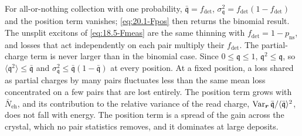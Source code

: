 For all-or-nothing collection with one probability, $\bar{\mathfrak{q}} = f_{\mathrm{det}}$, $\sigma_{\mathfrak{q}}^2 = f_{\mathrm{det}}(1 - f_{\mathrm{det}})$ and the position term vanishes; \cref{eq:20.1-Fpos} then returns the binomial result. The unsplit excitons of \cref{eq:18.5-Fmeas} are the same thinning with $f_{\mathrm{det}} = 1 - p_{\mathrm{ns}}$, and losses that act independently on each pair multiply their $f_{\mathrm{det}}$. The partial-charge term is never larger than in the binomial case. Since $0 \le \mathfrak{q} \le 1$, $\mathfrak{q}^2 \le \mathfrak{q}$, so $\langle\mathfrak{q}^2\rangle \le \bar{\mathfrak{q}}$ and $\sigma_{\mathfrak{q}}^2 \le \bar{\mathfrak{q}}(1 - \bar{\mathfrak{q}})$ at every position. At a fixed position, a loss shared as partial charges by many pairs fluctuates less than the same mean loss concentrated on a few pairs that are lost entirely. The position term grows with $\bar N_{\mathrm{eh}}$, and its contribution to the relative variance of the read charge, $\operatorname{Var}_{\bm{r}}\bar{\mathfrak{q}}/\langle\bar{\mathfrak{q}}\rangle^2$, does not fall with energy. The position term is a spread of the gain across the crystal, which no pair statistics removes, and it dominates at large deposits.

